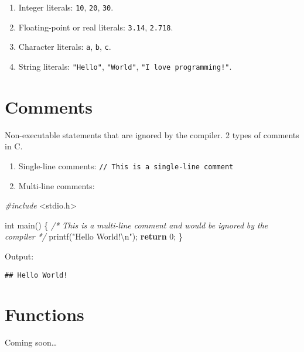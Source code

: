 \documentclass[
]{article}
\newenvironment{Shaded}{\begin{snugshade}}{\end{snugshade}}
\newcommand{\CommentTok}[1]{\textcolor[rgb]{0.56,0.35,0.01}{\textit{#1}}}
\newcommand{\ControlFlowTok}[1]{\textcolor[rgb]{0.13,0.29,0.53}{\textbf{#1}}}
\newcommand{\DataTypeTok}[1]{\textcolor[rgb]{0.13,0.29,0.53}{#1}}
\newcommand{\DecValTok}[1]{\textcolor[rgb]{0.00,0.00,0.81}{#1}}
\newcommand{\ImportTok}[1]{#1}
\newcommand{\NormalTok}[1]{#1}
\newcommand{\PreprocessorTok}[1]{\textcolor[rgb]{0.56,0.35,0.01}{\textit{#1}}}
\newcommand{\SpecialCharTok}[1]{\textcolor[rgb]{0.00,0.00,0.00}{#1}}
\newcommand{\StringTok}[1]{\textcolor[rgb]{0.31,0.60,0.02}{#1}}
\providecommand{\tightlist}{%
  \setlength{\itemsep}{0pt}\setlength{\parskip}{0pt}}
\begin{document}
\begin{enumerate}
\def\labelenumi{\arabic{enumi}.}
\tightlist
\item
  Integer literals: \texttt{10}, \texttt{20}, \texttt{30}.
\item
  Floating-point or real literals: \texttt{3.14}, \texttt{2.718}.
\item
  Character literals: \texttt{\textquotesingle{}a\textquotesingle{}},
  \texttt{\textquotesingle{}b\textquotesingle{}},
  \texttt{\textquotesingle{}c\textquotesingle{}}.
\item
  String literals: \texttt{"Hello"}, \texttt{"World"},
  \texttt{"I\ love\ programming!"}.
\end{enumerate}

\hypertarget{comments}{%
\section{Comments}\label{comments}}

Non-executable statements that are ignored by the compiler. 2 types of
comments in C.

\begin{enumerate}
\def\labelenumi{\arabic{enumi}.}
\tightlist
\item
  Single-line comments: \texttt{//\ This\ is\ a\ single-line\ comment}
\item
  Multi-line comments:
\end{enumerate}

\begin{Shaded}
\begin{Highlighting}[]
\PreprocessorTok{\#include }\ImportTok{\textless{}stdio.h\textgreater{}}

\DataTypeTok{int}\NormalTok{ main() \{}
    \CommentTok{/*}
\CommentTok{        This is a}
\CommentTok{        multi{-}line comment}
\CommentTok{        and would be ignored}
\CommentTok{        by the compiler}
\CommentTok{    */}
\NormalTok{    printf(}\StringTok{"Hello World!}\SpecialCharTok{\textbackslash{}n}\StringTok{"}\NormalTok{);}
    \ControlFlowTok{return} \DecValTok{0}\NormalTok{;}
\NormalTok{\}}
\end{Highlighting}
\end{Shaded}

Output:

\begin{verbatim}
## Hello World!
\end{verbatim}

\hypertarget{functions}{%
\section{Functions}\label{functions}}

Coming soon\ldots{}
\end{document}
